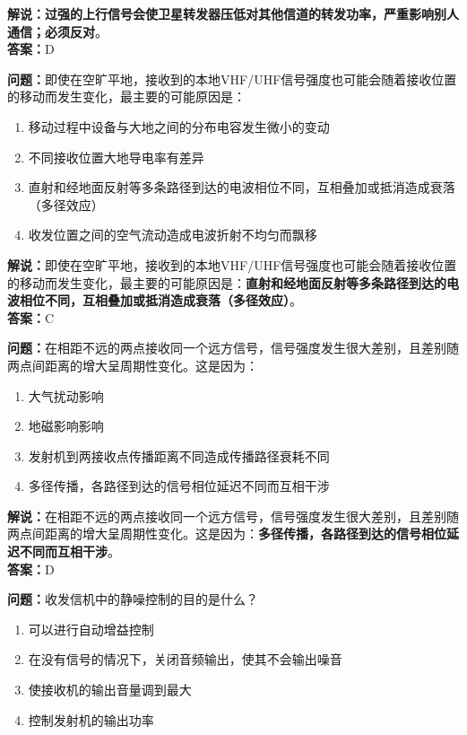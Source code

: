 \textbf{解说：过强的上行信号会使卫星转发器压低对其他信道的转发功率，严重影响别人通信；必须反对}。\\\textbf{答案：}D%


\textbf{问题：}即使在空旷平地，接收到的本地VHF/UHF信号强度也可能会随着接收位置的移动而发生变化，最主要的可能原因是：

\begin{enumerate}[label=\Alph*), leftmargin=1.5cm]
	\item 移动过程中设备与大地之间的分布电容发生微小的变动
	\item 不同接收位置大地导电率有差异
	\item 直射和经地面反射等多条路径到达的电波相位不同，互相叠加或抵消造成衰落（多径效应）
	\item 收发位置之间的空气流动造成电波折射不均匀而飘移
\end{enumerate}

\textbf{解说：}即使在空旷平地，接收到的本地VHF/UHF信号强度也可能会随着接收位置的移动而发生变化，最主要的可能原因是：\textbf{直射和经地面反射等多条路径到达的电波相位不同，互相叠加或抵消造成衰落（多径效应）}。\\\textbf{答案：}C%




\textbf{问题：}在相距不远的两点接收同一个远方信号，信号强度发生很大差别，且差别随两点间距离的增大呈周期性变化。这是因为：

\begin{enumerate}[label=\Alph*), leftmargin=1.5cm]
	\item 大气扰动影响
	\item 地磁影响影响
	\item 发射机到两接收点传播距离不同造成传播路径衰耗不同
	\item 多径传播，各路径到达的信号相位延迟不同而互相干涉
\end{enumerate}

\textbf{解说：}在相距不远的两点接收同一个远方信号，信号强度发生很大差别，且差别随两点间距离的增大呈周期性变化。这是因为：\textbf{多径传播，各路径到达的信号相位延迟不同而互相干涉}。\\\textbf{答案：}D%


\textbf{问题：}收发信机中的静噪控制的目的是什么？

\begin{enumerate}[label=\Alph*), leftmargin=1.5cm]
	\item 可以进行自动增益控制
	\item 在没有信号的情况下，关闭音频输出，使其不会输出噪音%
	\item 使接收机的输出音量调到最大
	\item 控制发射机的输出功率
\end{enumerate}

